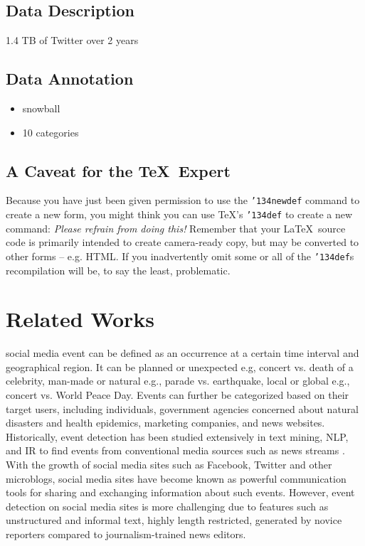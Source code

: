 \documentclass{acm_proc_article-sp}
\begin{document}
\subsection{Data Description}

1.4 TB of Twitter over 2 years

\subsection{Data Annotation}
\begin{itemize}
\item snowball 
\item 10 categories
\end{itemize}


\subsection*{A {\secit Caveat} for the \TeX\ Expert}
Because you have just been given permission to
use the \texttt{{\char'134}newdef} command to create a
new form, you might think you can
use \TeX's \texttt{{\char'134}def} to create a
new command: \textit{Please refrain from doing this!}
Remember that your \LaTeX\ source code is primarily intended
to create camera-ready copy, but may be converted
to other forms -- e.g. HTML. If you inadvertently omit
some or all of the \texttt{{\char'134}def}s recompilation will
be, to say the least, problematic.

\section{Related Works}
social media event can be defined as an occurrence at a certain time interval and geographical region. It can be planned or unexpected e.g, concert vs. death of a celebrity, man-made or natural e.g., parade vs. earthquake, local or global e.g., concert vs. World Peace Day. Events can further be categorized based on their target users, including individuals, government agencies concerned about natural disasters and health epidemics, marketing companies, and news websites.  Historically, event detection has been studied extensively in text mining, NLP, and IR to find events from conventional media sources such as news streams  \cite{yang}. With the growth of social media sites such as Facebook, Twitter and other microblogs, social media sites have become known as powerful communication tools for sharing and exchanging information about such events. However, event detection on social media sites is more challenging due to features such as unstructured and informal text, highly length restricted, generated by novice reporters compared to journalism-trained news editors.%
\end{document}
